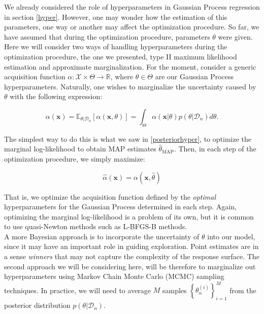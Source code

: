 \documentclass[10pt,a4paper,twoside]{book}
\begin{document}
We already considered the role of hyperparameters in Gaussian Process regression in section \ref{hyper}. However, one may wonder how the estimation of this parameters, one way or another may affect the optimization procedure. So far, we have assumed that during the optimization procedure, parameters $\theta$ were given. Here we will consider two ways of handling hyperparameters during the optimization procedure, the one we presented, type II maximum likelihood estimation and approximate marginalization. For the moment, consider a generic acquisition function $\alpha:\mathcal{X} \times \Theta \rightarrow \mathbb{R}$, where $\theta \in \Theta$ are our Gaussian Process hyperparameters. Naturally, one wishes to marginalize the uncertainty caused by $\theta$ with the following expression:

\begin{equation}
\alpha(\boldsymbol{x}) = \mathbb{E}_{\theta|\mathcal{D}_n}\left[ \alpha(\boldsymbol{x}, \theta) \right] = \int_{\Theta} \alpha(\boldsymbol{x}|\theta)p(\theta|\mathcal{D}_n)d\theta.
\end{equation}

The simplest way to do this is what we saw in \ref{posteriorhyper}, to optimize the marginal log-likelihood to obtain MAP estimates $\hat{\theta}_{\mathrm{MAP}}$. Then, in each step of the optimization procedure, we simply maximize:

\begin{equation}
\hat{\alpha}(\boldsymbol{x}) = \alpha(\boldsymbol{x}, \hat{\theta})
\end{equation}

That is, we optimize the acquisition function defined by the \textit{optimal} hyperparameters for the Gaussian Process determined in each step. Again, optimizing the marginal log-likelihood is a problem of its own, but it is common to use quasi-Newton methods such as L-BFGS-B methods.\\

A more Bayesian approach is to incorporate the uncertainty of $\theta$ into our model, since it may have an important role in guiding exploration. Point estimates are in a sense \textit{winners} that may not capture the complexity of the response surface. The second approach we will be considering here, will be therefore to marginalize out hyperparameters using Markov Chain Monte Carlo (MCMC) sampling techniques. In practice, we will need to average $M$ samples $\left\lbrace\theta_n^{(i)}\right\rbrace ^{M}_{i=1}$ from the posterior distribution $p(\theta|\mathcal{D}_n)$.
\end{document}
